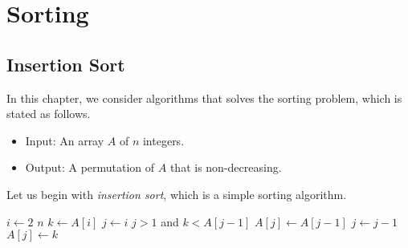 \chapter{Sorting}
\section{Insertion Sort}
In this chapter, we consider algorithms that solves the sorting problem, which
is stated as follows.
\begin{problem}
  \leavevmode
  \begin{itemize}
    \item Input: An array $A$ of $n$ integers.
    \item Output: A permutation of $A$ that is non-decreasing.
  \end{itemize}
\end{problem}

\noindent
Let us begin with \emph{insertion sort}, which is a simple sorting algorithm.
\begin{codebox}
  \li \For $i \gets 2$ \To $n$ \Do
  \li     $k \gets A[i]$
  \li     $j \gets i$
  \li     \While $j > 1$ and $k < A[j - 1]$ \Do
  \li         $A[j] \gets A[j - 1]$
  \li         $j \gets j - 1$
          \End
  \li     $A[j] \gets k$
      \End
\end{codebox}

